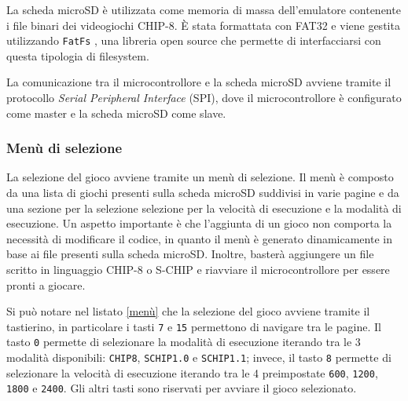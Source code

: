 \documentclass[a4paper]{article}
\begin{document}
La scheda microSD è utilizzata come memoria di massa dell'emulatore contenente i file
binari dei videogiochi CHIP-8. È stata formattata con FAT32 e viene gestita utilizzando
\texttt{FatFs} \cite{elm-chan:fatfs}, una libreria open source che permette di
interfacciarsi con questa tipologia di filesystem.

La comunicazione tra il microcontrollore e la scheda microSD avviene tramite il protocollo
\textit{Serial Peripheral Interface} (SPI), dove il microcontrollore è configurato come
master e la scheda microSD come slave.

%

%

\subsubsection{Menù di selezione}

La selezione del gioco avviene tramite un menù di selezione. Il menù è composto da una lista
di giochi presenti sulla scheda microSD suddivisi in varie pagine e da una sezione per la
selezione selezione per la velocità di esecuzione e la modalità di esecuzione. Un aspetto
importante è che l'aggiunta di un gioco non comporta la necessità di modificare il codice,
in quanto il menù è generato dinamicamente in base ai file presenti sulla scheda microSD.
Inoltre, basterà aggiungere un file scritto in linguaggio CHIP-8 o S-CHIP e riavviare il
microcontrollore per essere pronti a giocare.

Si può notare nel listato \ref{menù} che la selezione del gioco avviene tramite il tastierino,
in particolare i tasti \texttt{7} e \texttt{15} permettono di navigare tra le pagine. Il tasto
\texttt{0} permette di selezionare la modalità di esecuzione iterando tra le 3 modalità
disponibili: \texttt{CHIP8}, \texttt{SCHIP1.0} e \texttt{SCHIP1.1}; invece, il tasto \texttt{8}
permette di selezionare la velocità di esecuzione iterando tra le 4 preimpostate
\texttt{600}, \texttt{1200}, \texttt{1800} e \texttt{2400}. Gli altri tasti sono riservati per
avviare il gioco selezionato.
\end{document}
